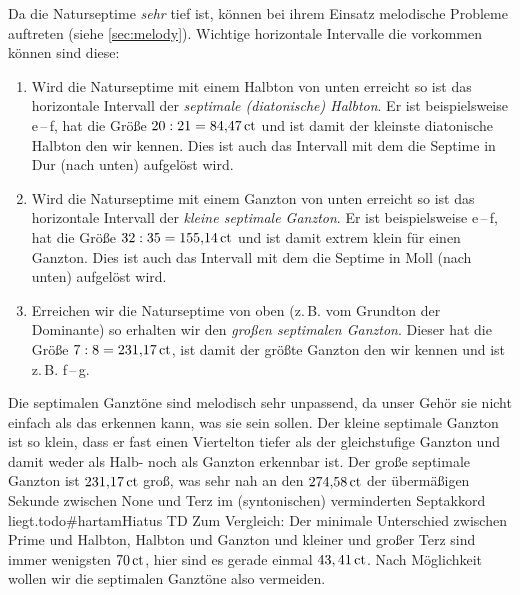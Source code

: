 Da die Naturseptime \emph{sehr} tief ist, können bei ihrem Einsatz melodische
Probleme auftreten (siehe \cref{sec:melody}).
Wichtige horizontale Intervalle die vorkommen können sind diese:
\begin{enumerate}
  \item Wird die Naturseptime mit einem Halbton von unten erreicht so ist das
  horizontale Intervall der \emph{septimale (diatonische) Halbton}. Er ist beispielsweise
  \naturalm e\,–\,\septimal f, hat die Größe $20:21 = 84{,}47\,\text{ct}$ und ist damit
  der kleinste diatonische Halbton den wir kennen. Dies ist auch das Intervall
  mit dem die Septime in Dur (nach unten) aufgelöst wird.
  \item Wird die Naturseptime mit einem Ganzton von unten erreicht so ist das
  horizontale Intervall der \emph{kleine septimale Ganzton}. Er ist beispielsweise \flatp e\,–\,\septimal f, hat die Größe
  $32:35 = 155{,}14\,\text{ct}$ und ist damit extrem klein für einen Ganzton. Dies ist
  auch das Intervall mit dem die Septime in Moll (nach unten) aufgelöst wird.
  \item Erreichen wir die Naturseptime von oben (z.\,B. vom Grundton der
  Dominante) so erhalten wir den \emph{großen septimalen Ganzton}. Dieser hat
  die Größe $7:8 = 231{,}17\,\text{ct}$, ist damit der größte Ganzton den wir kennen und
  ist z.\,B. \septimal f\,–\,g.
\end{enumerate}

Die septimalen Ganztöne sind melodisch sehr unpassend, da unser Gehör sie nicht
einfach als das erkennen kann, was sie sein sollen. Der kleine septimale Ganzton
ist so klein, dass er fast einen Viertelton tiefer als der gleichstufige Ganzton
und damit weder als Halb- noch als Ganzton erkennbar ist. Der große septimale
Ganzton ist $231{,}17\,\text{ct}$ groß, was sehr nah an den $274{,}58\,\text{ct}$ der
übermäßigen Sekunde zwischen None und Terz im (syntonischen) verminderten
Septakkord liegt.todo{\#hartamHiatus TD} Zum Vergleich: Der minimale Unterschied
zwischen Prime und Halbton, Halbton und Ganzton und kleiner und großer Terz sind
immer wenigsten $70\,\text{ct}$, hier sind es gerade einmal $43,41\,\text{ct}$. Nach Möglichkeit
wollen wir die septimalen Ganztöne also vermeiden.

